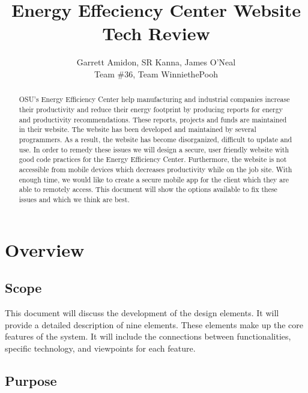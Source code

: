 \documentclass[letterpaper,10pt,titlepage,journal,compsoc,draftclsnofoot,onecolumn]{IEEEtran}
\title{Energy Effeciency Center Website \\
	\large Tech Review}
\author{Garrett Amidon, SR Kanna, James O'Neal\\ Team \#36, Team WinniethePooh}
\begin{document}
\begin{titlingpage}
    \maketitle
	\centering{}
    \begin{abstract}
        
        OSU’s Energy Efficiency Center help manufacturing and industrial companies increase their productivity and reduce their energy footprint by producing reports for energy and productivity recommendations. These reports, projects and funds are maintained in their website. The website has been developed and maintained by several programmers. As a result, the website has become disorganized, difficult to update and use. In order to remedy these issues we will design a secure, user friendly website with good code practices for the Energy Efficiency Center. Furthermore, the website is not accessible from mobile devices which decreases productivity while on the job site. With enough time, we would like to create a secure mobile app for the client which they are able to remotely access. This document will show the options available to fix these issues and which we think are best. 
        
    \end{abstract}
\end{titlingpage}

\newpage

\tableofcontents{}

\newpage


\section{Overview}

\subsection{Scope}

This document will discuss the development of the design elements. It will provide a detailed description of nine elements. These elements make up the core features of the system. It will include the connections between functionalities, specific technology, and viewpoints for each feature.

\subsection{Purpose}
\end{document}
